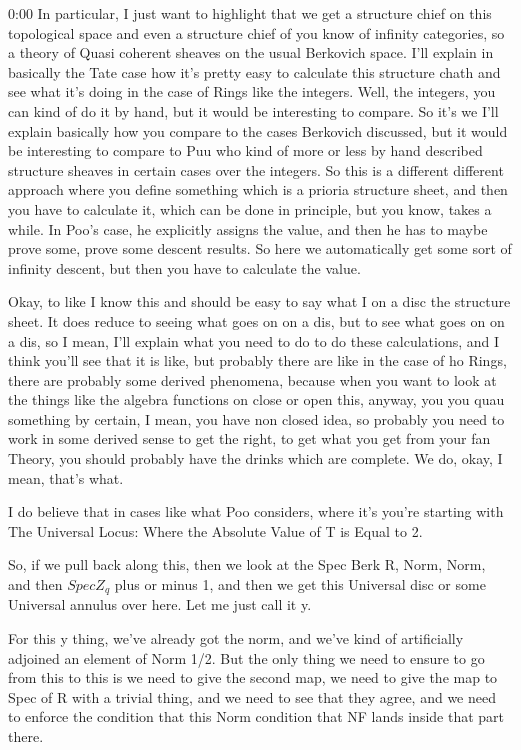 \begin{unfinished}{0:00}
In particular, I just want to highlight that we get a structure chief on this topological space and even a structure chief of you know of infinity categories, so a theory of Quasi coherent sheaves on the usual Berkovich space. I'll explain in basically the Tate case how it's pretty easy to calculate this structure chath and see what it's doing in the case of Rings like the integers. Well, the integers, you can kind of do it by hand, but it would be interesting to compare. So it's we I'll explain basically how you compare to the cases Berkovich discussed, but it would be interesting to compare to Puu who kind of more or less by hand described structure sheaves in certain cases over the integers. So this is a different different approach where you define something which is a prioria structure sheet, and then you have to calculate it, which can be done in principle, but you know, takes a while. In Poo's case, he explicitly assigns the value, and then he has to maybe prove some, prove some descent results. So here we automatically get some sort of infinity descent, but then you have to calculate the value.

Okay, to like I know this and should be easy to say what I on a disc the structure sheet. It does reduce to seeing what goes on on a dis, but to see what goes on on a dis, so I mean, I'll explain what you need to do to do these calculations, and I think you'll see that it is like, but probably there are like in the case of ho Rings, there are probably some derived phenomena, because when you want to look at the things like the algebra functions on close or open this, anyway, you you quau something by certain, I mean, you have non closed idea, so probably you need to work in some derived sense to get the right, to get what you get from your fan Theory, you should probably have the drinks which are complete. We do, okay, I mean, that's what.

I do believe that in cases like what Poo considers, where it's you're starting with
The Universal Locus: Where the Absolute Value of T is Equal to 2.

So, if we pull back along this, then we look at the Spec Berk R, Norm, Norm, and then $Spec Z_q$ plus or minus 1, and then we get this Universal disc or some Universal annulus over here. Let me just call it y.

For this y thing, we've already got the norm, and we've kind of artificially adjoined an element of Norm 1/2. But the only thing we need to ensure to go from this to this is we need to give the second map, we need to give the map to Spec of R with a trivial thing, and we need to see that they agree, and we need to enforce the condition that this Norm condition that NF lands inside that part there.


\end{unfinished}
